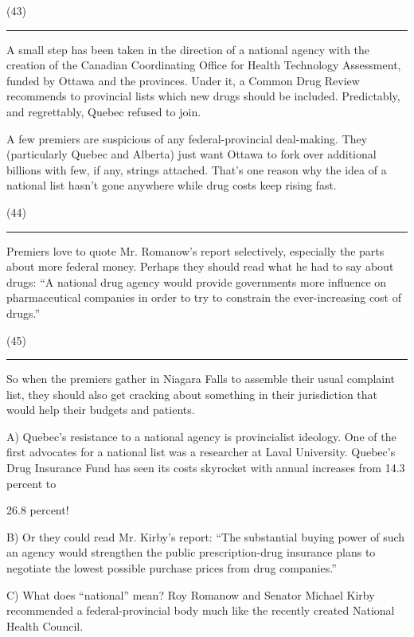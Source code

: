 \documentclass[UTF8,11pt]{ctexart}
\begin{document}
(43)\par\noindent\rule{.95\linewidth}{.4pt}\par


A small step has been taken in the direction of a national agency with the creation of the Canadian Coordinating Office for Health Technology Assessment, funded by Ottawa and the provinces. Under it, a Common Drug Review recommends to provincial lists which new drugs should be included. Predictably, and regrettably, Quebec refused to join.


A few premiers are suspicious of any federal-provincial deal-making. They (particularly Quebec and Alberta) just want Ottawa to fork over additional billions with few, if any, strings attached. That’s one reason why the idea of a national list hasn’t gone anywhere while drug costs keep rising fast.


(44)\par\noindent\rule{.95\linewidth}{.4pt}\par


Premiers love to quote Mr. Romanow’s report selectively, especially the parts about more federal money. Perhaps they should read what he had to say about drugs: “A national drug agency would provide governments more influence on pharmaceutical companies in order to try to constrain the ever-increasing cost of drugs.”


(45)\par\noindent\rule{.95\linewidth}{.4pt}\par  So when the premiers gather in Niagara Falls to assemble their usual complaint list, they should also get cracking about something in their jurisdiction that would help their budgets and patients.


A) Quebec’s resistance to a national agency is provincialist ideology. One of the first advocates for a national list was a researcher at Laval University. Quebec’s Drug Insurance Fund has seen its costs skyrocket with annual increases from 14.3 percent to


26.8 percent!


B) Or they could read Mr. Kirby’s report: “The substantial buying power of such an agency would strengthen the public prescription-drug insurance plans to negotiate the lowest possible purchase prices from drug companies.”


C) What does “national” mean? Roy Romanow and Senator Michael Kirby recommended a federal-provincial body much like the recently created National Health Council.
\end{document}
